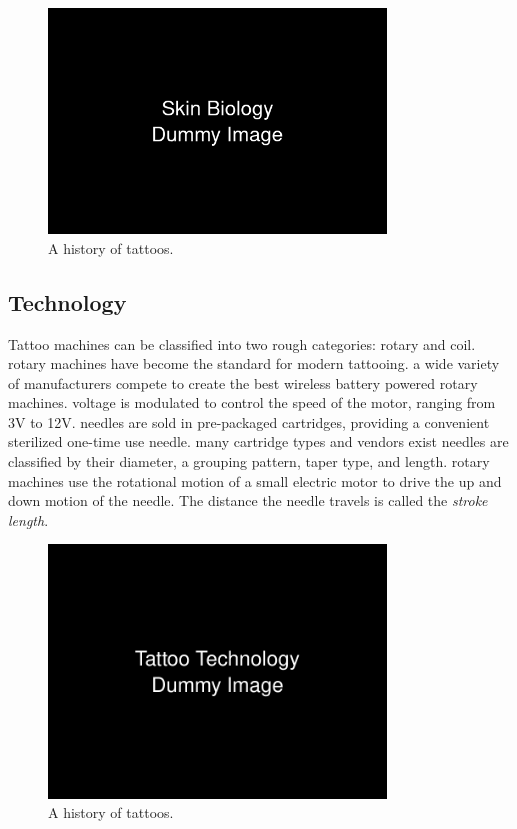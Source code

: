 \documentclass[11pt]{article}
\begin{document}
\begin{figure}[h]
    \centering
    \includegraphics[width=0.8\textwidth]{figures/biology.png}
    \caption{A history of tattoos.}
    \label{fig:timeline}
\end{figure}

\pagebreak

\subsection{Technology}

Tattoo machines can be classified into two rough categories: rotary and coil.
rotary machines have become the standard for modern tattooing.
a wide variety of manufacturers compete to create the best wireless battery powered rotary machines.
voltage is modulated to control the speed of the motor, ranging from 3V to 12V.
needles are sold in pre-packaged cartridges, providing a convenient sterilized one-time use needle.
many cartridge types and vendors exist
needles are classified by their diameter, a grouping pattern, taper type, and length.
rotary machines use the rotational motion of a small electric motor to drive the up and down motion of the needle.
The distance the needle travels is called the \textit{stroke length}.

\begin{figure}[h]
    \centering
    \includegraphics[width=0.8\textwidth]{figures/technology.png}
    \caption{A history of tattoos.}
    \label{fig:timeline}
\end{figure}
\end{document}

